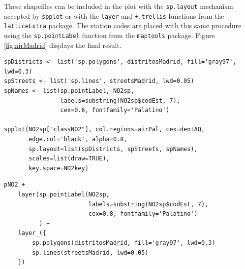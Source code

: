 \documentclass[smallroyalvopaper]{memoir}
\begin{document}
These shapefiles can be included in the plot with the \texttt{sp.layout}
mechanism accepted by \texttt{spplot} or with the \texttt{layer} and \texttt{+.trellis}
functions from the \texttt{latticeExtra} package. The station codes are
placed with this same procedure using the \texttt{sp.pointLabel} function
from the \texttt{maptools} package. Figure \ref{fig:airMadrid} displays the
final result.


\lstset{language=R,numbers=none}
\begin{lstlisting}
spDistricts <- list('sp.polygons', distritosMadrid, fill='gray97', lwd=0.3)
spStreets <- list('sp.lines', streetsMadrid, lwd=0.05)
spNames <- list(sp.pointLabel, NO2sp,
                labels=substring(NO2sp$codEst, 7),
                cex=0.6, fontfamily='Palatino')

spplot(NO2sp["classNO2"], col.regions=airPal, cex=dentAQ,
       edge.col='black', alpha=0.8,
       sp.layout=list(spDistricts, spStreets, spNames),
       scales=list(draw=TRUE),
       key.space=NO2key)
\end{lstlisting}

\lstset{language=R,numbers=none}
\begin{lstlisting}
pNO2 +
    layer(sp.pointLabel(NO2sp,
                        labels=substring(NO2sp$codEst, 7),
                        cex=0.8, fontfamily='Palatino')
          ) +
    layer_({
        sp.polygons(distritosMadrid, fill='gray97', lwd=0.3)
        sp.lines(streetsMadrid, lwd=0.05)
    })
\end{lstlisting}
\end{document}
